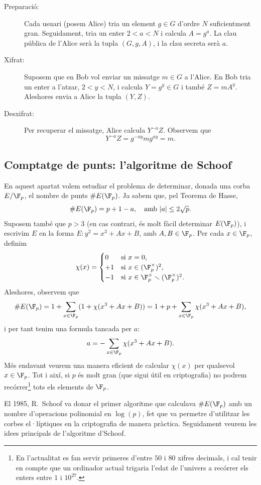  \begin{description}
 \item[Preparació: ] Cada usuari (posem Alice) tria un element $g\in G$ d'ordre $N$ suficientment gran. Seguidament, tria un enter $2< a < N$ i calcula $A=g^a$. La clau pública de l'Alice serà la tupla $(G,g,A)$, i la clau secreta serà $a$.
 \item[Xifrat: ] Suposem que en Bob vol enviar un missatge $m\in G$ a l'Alice. En Bob tria un enter a l'atzar, $2< y < N$, i calcula $Y=g^y\in G$ i també $Z=mA^y$. Aleshores envia a Alice la tupla $(Y,Z)$.
 \item[Desxifrat: ] Per recuperar el missatge, Alice calcula $Y^{-a} Z$. Observem que
 \[
 Y^{-a}Z = g^{-ay}mg^{ay} = m.
 \]
 \end{description}
 
 \subsection{Comptatge de punts: l'algoritme de Schoof}
 En aquest apartat volem estudiar el problema de determinar, donada una corba $E/\F_p$, el nombre de punts $\# E(\F_p)$. Ja sabem que, pel Teorema de Hasse,
 \[
 \# E(\F_p) = p + 1 - a,\quad\text{amb } |a|\leq 2\sqrt{p}.
 \]
 Suposem també que $p>3$ (en cas contrari, és molt fàcil determinar $E(\F_p)$), i escrivim $E$ en la forma $E\colon y^2=x^3+Ax+B$, amb $A,B\in\F_p$.
 Per cada $x\in \F_p$, definim
 \[
 \chi(x)=\begin{cases}
 0&\text{si } x=0,\\
 +1&\text{si } x\in(\F_p^\times)^2,\\
 -1&\text{si } x\in \F_p^\times\smallsetminus (\F_p^\times)^2.
 \end{cases}
 \]
 Aleshores, observem que
 \[
 \# E(\F_p) = 1+ \sum_{x\in\F_p} (1+\chi(x^3+Ax+B))= 1+p+\sum_{x\in\F_p} \chi(x^3+Ax+B),
 \]
 i per tant tenim una formula tancada per $a$:
 \[
 a = -\sum_{x\in\F_p}\chi(x^3+Ax+B).
 \]
 Més endavant veurem una manera eficient de calcular $\chi(x)$ per qualsevol $x\in\F_p$. Tot i així, si $p$ és molt gran (que sigui útil en criptografia) no podrem recórrer\footnote{En l'actualitat es fan servir primeres d'entre $50$ i $80$ xifres decimals, i cal tenir en compte que un ordinador actual trigaria l'edat de l'univers a recórrer els enters entre $1$ i $10^{27}$.} tots els elements de $\F_p$.
 
 El 1985, R.~Schoof va donar el primer algoritme que calculava $\#E(\F_p)$ amb un nombre d'operacions polinomial en $\log(p)$, fet que va permetre d'utilitzar les corbes el·líptiques en la criptografia de manera pràctica. Seguidament veurem les idees principals de l'algoritme d'Schoof.
 
